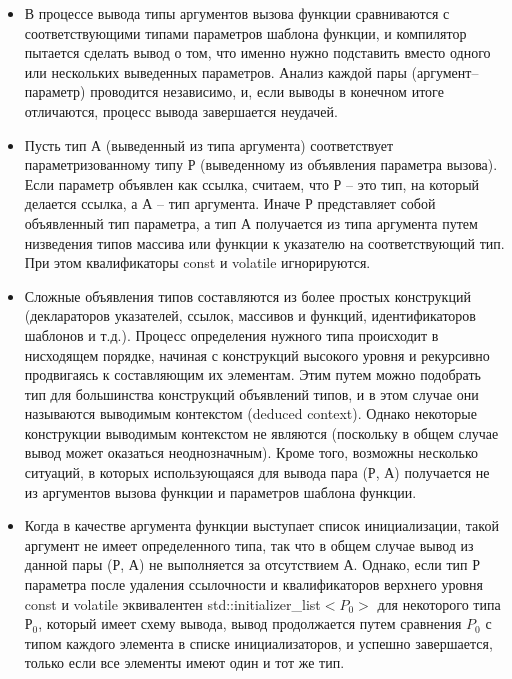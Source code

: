 \documentclass[a4paper,12pt]{article}	%
\begin{document}
	\begin{itemize}
	
		\item В процессе вывода типы аргументов вызова функции сравниваются с  соответствующими типами параметров шаблона функции, и компилятор пытается сделать вывод о том, что именно нужно подставить вместо одного или нескольких выведенных параметров. Анализ каждой пары (аргумент--параметр) проводится независимо, и, если выводы в конечном итоге отличаются, процесс вывода завершается неудачей.
	
		\item Пусть тип А (выведенный из типа аргумента) соответствует параметризованному типу Р (выведенному из объявления параметра вызова). Если параметр объявлен как ссылка, считаем, что Р -- это тип, на который делается ссылка, а А -- тип аргумента. Иначе Р представляет собой объявленный тип параметра, а тип А получается из типа аргумента путем низведения типов массива или функции к указателю на соответствующий тип. При этом квалификаторы const и volatile игнорируются.
	
		\item Сложные объявления типов составляются из более простых конструкций (деклараторов указателей, ссылок, массивов и функций, идентификаторов шаблонов и т.д.). Процесс определения нужного типа происходит в нисходящем порядке, начиная с конструкций высокого уровня и рекурсивно продвигаясь к составляющим их элементам. Этим путем можно подобрать тип для большинства конструкций объявлений типов, и в этом случае они называются выводимым контекстом (deduced context). Однако некоторые конструкции выводимым контекстом не являются (поскольку в общем случае вывод может оказаться неоднозначным). Кроме того, возможны несколько ситуаций, в которых использующаяся для вывода пара (Р, А) получается не из аргументов вызова функции и параметров шаблона функции.
	
		\item Когда в качестве аргумента функции выступает список инициализации, такой аргумент не имеет определенного типа, так что в общем случае вывод из данной пары (Р, А) не выполняется за отсутствием А. Однако, если тип Р параметра после удаления ссылочности и квалификаторов верхнего уровня const и volatile эквивалентен std::initializer\_list$<P_0>$ для некоторого типа $Р_0$, который имеет схему вывода, вывод продолжается путем сравнения $P_0$ с типом каждого элемента в списке инициализаторов, и успешно завершается, только если все элементы имеют один и тот же тип.
	

\end{itemize}
\end{document}

